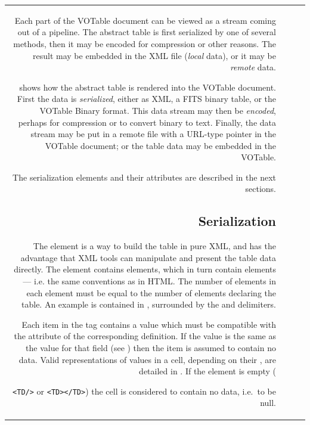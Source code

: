 \begin{tabular}{RRCp{0.8\textwidth}}
\begin{center}
Each  part of the VOTable document can be viewed as
a stream coming out of a pipeline.
The abstract table is first serialized by one of several
methods, then it may be encoded for compression or other reasons. The
result may be embedded in the XML file ({\it local} data), or it may
be {\it remote} data.

shows how the abstract table is rendered into the
VOTable document. First the data is {\it serialized}, either
as XML, a FITS binary table, or the VOTable
Binary format. This data stream may then be {\it encoded},
perhaps for compression or to convert binary to text. Finally, the
data stream may be put in a remote file with a URL-type pointer in
the VOTable document; or the table data may be embedded in the
VOTable. 


The serialization elements and their attributes are
described in the next sections.

\subsection{\texorpdfstring{ Serialization}
                           {TABLEDATA Serialization}}
\label{sec:TABLEDATA}
\label{elem:TD}
\label{elem:TR}

The  element is a way to build the table in pure XML,
and has the advantage that XML tools can manipulate and present
the table data directly.
The  element  contains {}
elements, which in turn contain {}
elements --- i.e. the same conventions as in HTML.
The number of {} elements in each {} element
must be equal to the number of {} elements declaring the table.
An example is contained in ,
surrounded by the  and 
delimiters.

Each item in the {} tag 
contains a value which must be compatible with 
the {} attribute of the corresponding {} definition.
If the value is the same as the {} value for that field
(see )
then the item is assumed to contain no data.
Valid representations of values in a cell, depending on their
, are detailed in .
If the {} element is empty ({\verb|<TD/>| or \verb|<TD></TD>|)
the cell is considered to contain no data, i.e.\ to be null.

}
\end{center}
\end{tabular}
